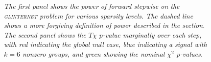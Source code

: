 \documentclass{imsart}
\begin{document}
\begin{figure}[!htp]
\begin{center}
\hspace{-15pt}
\caption{\small \it The first panel shows the power of forward stepwise
on the \textsc{glinternet} problem
for various sparsity levels. The dashed line shows a more forgiving
definition of power described in the section.
The second panel shows the $T\chi$ $p$-value marginally
over each step, with red indicating the global null case, blue
indicating a signal with $k=6$ nonzero groups, and green showing
the nominal $\chi^2$ $p$-values.}
\label{fig:glint}
\end{center}
\end{figure}
\end{document}
